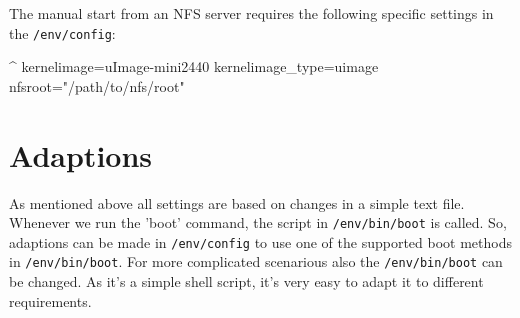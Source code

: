 The manual start from an NFS server requires the following specific settings
in the \texttt{/env/config}:

\begin{ptxshell}[escapechar=|]{^}
kernelimage=uImage-mini2440
kernelimage_type=uimage
nfsroot="/path/to/nfs/root"
\end{ptxshell}

\section{Adaptions}

As mentioned above all settings are based on changes in a simple text file.
Whenever we run the 'boot' command, the script in \texttt{/env/bin/boot} is
called. So, adaptions can be made in \texttt{/env/config} to use one of the
supported boot methods in \texttt{/env/bin/boot}. For more complicated
scenarious also the \texttt{/env/bin/boot} can be changed. As it's a simple
shell script, it's very easy to adapt it to different requirements.
